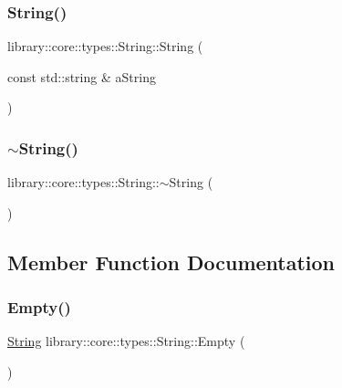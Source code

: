 \subsubsection{\texorpdfstring{String()}{String()}\hspace{0.1cm}{\footnotesize\ttfamily [2/2]}}
{\footnotesize\ttfamily library\+::core\+::types\+::\+String\+::\+String (\begin{DoxyParamCaption}\item[{const std\+::string \&}]{a\+String }\end{DoxyParamCaption})}

\mbox{\label{classlibrary_1_1core_1_1types_1_1_string_a97f9b0024a58372a0281b25e2811f3bf}} 
\subsubsection{\texorpdfstring{$\sim$\+String()}{~String()}}
{\footnotesize\ttfamily library\+::core\+::types\+::\+String\+::$\sim$\+String (\begin{DoxyParamCaption}{ }\end{DoxyParamCaption})}



\subsection{Member Function Documentation}
\mbox{\label{classlibrary_1_1core_1_1types_1_1_string_a4d359cb0dba46e14ca46f90e728c2b96}} 
\subsubsection{\texorpdfstring{Empty()}{Empty()}}
{\footnotesize\ttfamily \hyperlink{classlibrary_1_1core_1_1types_1_1_string}{String} library\+::core\+::types\+::\+String\+::\+Empty (\begin{DoxyParamCaption}{ }\end{DoxyParamCaption})\hspace{0.3cm}{\ttfamily [static]}}

